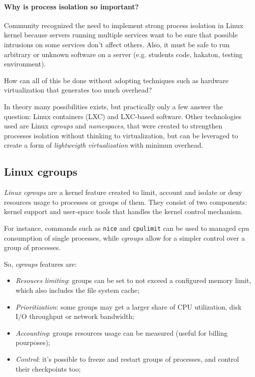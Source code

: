 \paragraph{Why is process isolation so important?}
Community recognized the need to implement strong process isolation in Linux
kernel because servers running multiple services want to be sure that possible
intrusions on some services don't affect others. Also, it must be safe to run
arbitrary or unknown software on a server (e.g. students code, hakaton, testing
environment).

\bigskip\noindent
How can all of this be done without adopting techniques such as hardware
virtualization that generates too much overhead?

In theory many possibilities exists, but practically only a few answer the
question: Linux containers (LXC) and LXC-based software. Other technologies
used are Linux \emph{cgroups} and \emph{namespaces}, that were created to
strengthen processes isolation without thinking to virtualization, but can be
leveraged to create a form of \emph{lightweigth virtualization} with minimun
overhead.

\subsection{Linux cgroups}
\emph{Linux cgroups} are a kernel feature created to limit, account and isolate
or deny resources usage to processes or groups of them. They consist of two
components: kernel support and user-space tools that handles the kernel control
mechanism.

For instance, commands such as \texttt{nice} and \texttt{cpulimit} can be used
to managed cpu consumption of single processes, while \emph{cgroups} allow for
a simpler control over a group of processes.

So, \emph{cgroups} features are:
\begin{itemize}
    \item \emph{Resouces limiting}: groups can be set to not exceed a configured
    memory limit, which also includes the file system cache;
    \item \emph{Prioritization}: some groups may get a larger share of CPU
    utilization, disk I/O throughput or network bandwidth;
    \item \emph{Accounting}: groups resources usage can be measured (useful
    for billing pourposes);
    \item \emph{Control}: it's possible to freeze and restart groups of
    processes, and control their checkpoints too;
\end{itemize}

